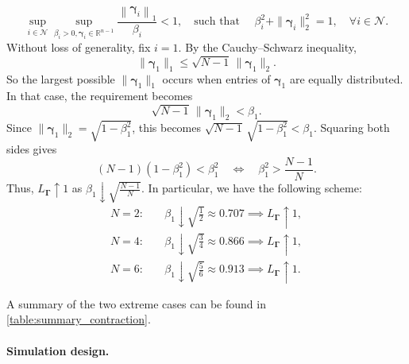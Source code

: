 \documentclass{article} %
\begin{document}
$$
\sup_{i \in \mathcal{N}}\sup_{\beta_i>0, \boldsymbol{\gamma}_i\in \mathbb{R}^{n-1}}\frac{\left\|\boldsymbol{\gamma}_i\right\|_1 }{\beta_i} < 1, \quad \text{such that } \quad \beta_i^2 + \|\boldsymbol{\gamma}_i\|_2^2 = 1, \quad \forall i \in \mathcal{N}.
$$
Without loss of generality, fix $i=1$. By the Cauchy–Schwarz inequality,
\[
\|\boldsymbol{\gamma}_1\|_1 \leq \sqrt{N-1}\,\|\boldsymbol{\gamma}_1\|_2.
\]
So the largest possible $\|\boldsymbol{\gamma}_1\|_1$ occurs when entries of $\boldsymbol{\gamma}_1$ are equally distributed. In that case, the requirement becomes
\[
\sqrt{N-1}\,\|\boldsymbol{\gamma}_1\|_2 < \beta_1.
\]
Since $\|\boldsymbol{\gamma}_1\|_2 = \sqrt{1-\beta_1^2}$, this becomes $\sqrt{N-1}\,\sqrt{1-\beta_1^2} < \beta_1$. Squaring both sides gives
\[
(N-1)(1-\beta_1^2) < \beta_1^2
\quad \iff \quad
\beta_1^2 > \frac{N-1}{N}.
\]
Thus, $L_{\boldsymbol{\Gamma}} \uparrow 1$ as $\beta_1 \downarrow \sqrt{\frac{N-1}{N}}$. In particular, we have the following scheme:
\[
\begin{aligned}
N=2: &\quad \beta_1 \downarrow  \sqrt{\tfrac{1}{2}} \approx 0.707 \implies  L_{\boldsymbol{\Gamma}} \uparrow 1,\\
N=4: &\quad \beta_1 \downarrow  \sqrt{\tfrac{3}{4}} \approx 0.866 \implies  L_{\boldsymbol{\Gamma}} \uparrow 1,\\
N=6: &\quad \beta_1 \downarrow  \sqrt{\tfrac{5}{6}} \approx 0.913 \implies  L_{\boldsymbol{\Gamma}} \uparrow 1.
\end{aligned}
\]

A summary of the two extreme cases can be found in \cref{table:summary_contraction}.

\paragraph{Simulation design.}
\end{document}
